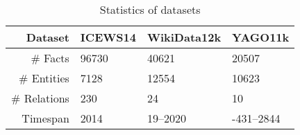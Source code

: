 \begin{table}[htb]
\centering
\begin{minipage}{\columnwidthcaption}
\centering
\caption{Statistics of datasets}
\label{tab:dataset_stats}
\end{minipage}

\vspace{-3mm}
\begin{tabular}{r|M{0.22}M{0.22}M{0.21}} \hline
Dataset & \mbox{ICEWS14} & WikiData12k & YAGO11k \\
\hline
\# Facts & 96730 & 40621 & 20507\\
\# Entities & 7128 & 12554 & 10623\\
\# Relations & 230 & 24 & 10\\
Timespan & 2014 & 19--2020 &-431--2844\\
\hline
\end{tabular}
\end{table}